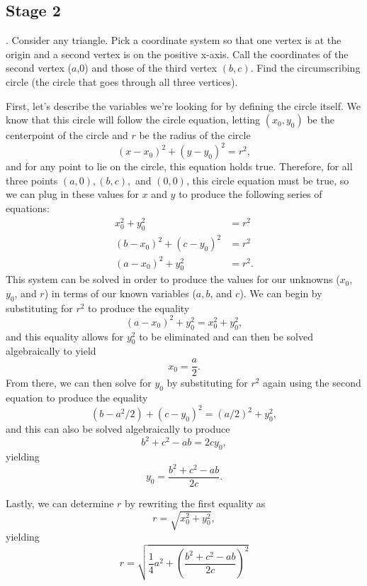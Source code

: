\documentclass{report}
\newcounter{problemctr}
\newcounter{subproblemctr}[problemctr]
\newcommand{\problem}[1]{%
  \stepcounter{problemctr}%
  \setcounter{subproblemctr}{0}%
  \noindent\arabic{problemctr}. #1\par
}
\newenvironment{answer}
  {\begin{minipage}{\linewidth}}
  {\end{minipage}}
\begin{document}
\subsection{Stage 2}
\problem{Consider any triangle. Pick a coordinate system so that one vertex is at the origin and a second vertex is on the positive x-axis. Call the coordinates of the second vertex ($a$,0) and those of the third vertex $(b,c)$. Find the circumscribing circle (the circle that goes through all three vertices).}
\begin{answer}
First, let's describe the variables we're looking for by defining the circle itself. We know that this circle will follow the circle equation, letting $(x_0, y_0)$ be the centerpoint of the circle and $r$ be the radius of the circle
\begin{equation*}
(x-x_0)^2 + (y-y_0)^2 = r^2,
\end{equation*}
and for any point to lie on the circle, this equation holds true. Therefore, for all three points $(a,0), (b,c),$ and $(0,0)$, this circle equation must be true, so we can plug in these values for $x$ and $y$ to produce the following series of equations:
\begin{align*}
x_0^2 + y_0^2 &= r^2 \\
(b - x_0)^2 + (c - y_0)^2 &= r^2 \\
(a - x_0)^2 + y_0^2 &= r^2.
\end{align*}
This system can be solved in order to produce the values for our unknowns ($x_0$, $y_0$, and $r$) in terms of our known variables ($a, b$, and $c$). We can begin by substituting for $r^2$ to produce the equality
$$(a-x_0)^2 + y_0^2 = x_0^2 + y_0^2,$$
and this equality allows for $y_0^2$ to be eliminated and can then be solved algebraically to yield
$$x_0 = \frac{a}{2}.$$
From there, we can then solve for $y_0$ by substituting for $r^2$ again using the second equation to produce the equality
$$(b - a^2/2) + (c - y_0)^2 = (a/2)^2 + y_0^2,$$
and this can also be solved algebraically to produce
$$b^2 + c^2 - ab = 2cy_0,$$
yielding
$$y_0 = \frac{b^2 + c^2 - ab}{2c}.$$

Lastly, we can determine $r$ by rewriting the first equality as
$$r = \sqrt{x_0^2 + y_0^2},$$
yielding
$$r = \sqrt{\frac{1}{4} a^2 + \left(\frac{b^2 + c^2 - ab}{2c}\right)^2}$$
\end{answer}
\end{document}
